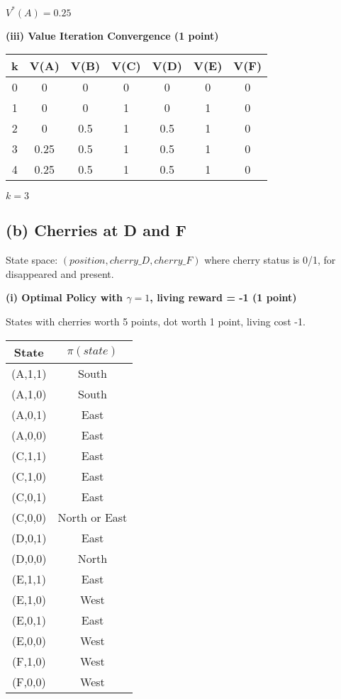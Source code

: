 \documentclass[11pt]{article}
\begin{document}
$\boxed{V^*(A) = 0.25}$

\textbf{(iii) Value Iteration Convergence (1 point)}

\begin{center}
\begin{tabular}{|c|c|c|c|c|c|c|}
\hline
k & V(A) & V(B) & V(C) & V(D) & V(E) & V(F) \\
\hline
0 & 0 & 0 & 0 & 0 & 0 & 0 \\
1 & 0 & 0 & 1 & 0 & 1 & 0 \\
2 & 0 & 0.5 & 1 & 0.5 & 1 & 0 \\
3 & 0.25 & 0.5 & 1 & 0.5 & 1 & 0 \\
4 & 0.25 & 0.5 & 1 & 0.5 & 1 & 0 \\
\hline
\end{tabular}
\end{center}

$\boxed{k = 3}$

\subsection{(b) Cherries at D and F}
State space: $(position, cherry\_D, cherry\_F)$ where cherry status is 0/1, for disappeared and present.

\textbf{(i) Optimal Policy with $\gamma=1$, living reward = -1 (1 point)}

States with cherries worth 5 points, dot worth 1 point, living cost -1.

\begin{center}
\begin{tabular}{|c|c|}
\hline
State & $\pi(state)$ \\
\hline
(A,1,1) & South \\
(A,1,0) & South \\
(A,0,1) & East \\
(A,0,0) & East \\
(C,1,1) & East \\
(C,1,0) & East \\
(C,0,1) & East \\
(C,0,0) & North or East \\
(D,0,1) & East \\
(D,0,0) & North \\
(E,1,1) & East \\
(E,1,0) & West \\
(E,0,1) & East \\
(E,0,0) & West \\
(F,1,0) & West \\
(F,0,0) & West \\
\hline
\end{tabular}
\end{center}
\end{document}
